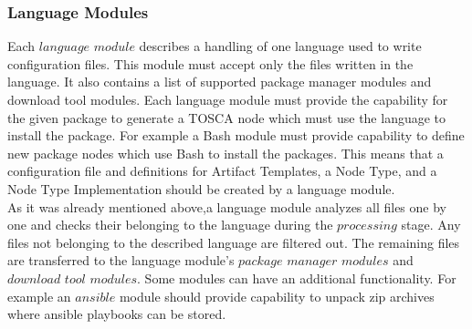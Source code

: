\subsubsection{Language Modules} \label{subs:archlm}
Each $language$ $module$ describes a handling of one language used to write configuration files.
This module must accept only the files written in the language.
It also contains a list of supported package manager modules and download tool modules.
Each language module must provide the capability for the given package to generate a TOSCA node which must use the language to install the package.
For example a Bash module must provide capability to define new package nodes which use Bash to install the packages.
This means that a configuration file and definitions for Artifact Templates, a Node Type, and a Node Type Implementation should be created by a language module.\\
As it was already mentioned above,a language module analyzes all files one by one and checks their belonging to the language during the $processing$ stage. 
Any files not belonging to the described language are filtered out.
The remaining files are transferred to the language module's $package$ $manager$ $modules$ and $download$ $tool$ $modules$.
Some modules can have an additional functionality.
For example an $ansible$ module should provide capability to unpack zip archives where ansible playbooks can be stored.

